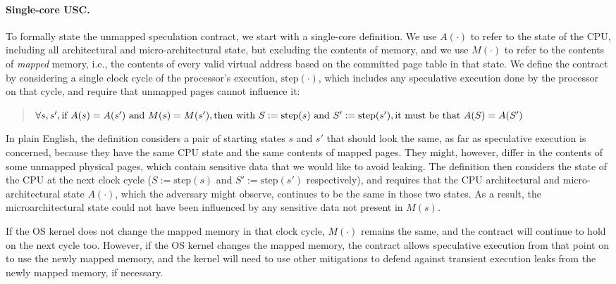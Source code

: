 \paragraph{Single-core USC.} To formally state the unmapped speculation contract, we start with a
single-core definition.  We use $A(\cdot)$ to refer to the state of
the CPU, including all architectural and micro-architectural state,
but excluding the contents of memory, and we use $M(\cdot)$ to refer
to the contents of \emph{mapped} memory, i.e., the contents of every
valid virtual address based on the committed page table in that state.
We define the contract by considering a single clock cycle of the
processor's execution, $\textrm{step}(\cdot)$, which includes any
speculative execution done by the processor on that cycle, and require
that unmapped pages cannot influence it:

\begin{small}
\begin{quote}
$\forall s, s', \\
  \textrm{if~} A(s) = A(s')
  \textrm{~and~} M(s) = M(s'), \\
  \textrm{then~with~} S := \textrm{step}(s)
  \textrm{~and~} S' := \textrm{step}(s'), \\
  \textrm{it~must~be~that~} A(S) = A(S')$
\end{quote}
\end{small}

In plain English, the definition considers a pair of starting states $s$
and $s'$ that should look the same, as far as speculative execution is
concerned, because they have the same CPU state and the same contents
of mapped pages.  They might, however, differ in the contents of some
unmapped physical pages, which contain sensitive data that we would
like to avoid leaking.  The definition then considers the state of
the CPU at the next clock cycle ($S := \textrm{step}(s)$ and $S' :=
\textrm{step}(s')$ respectively), and requires that the CPU architectural
and micro-architectural state $A(\cdot)$, which the adversary might
observe, continues to be the same in those two states.  As a result,
the microarchitectural state could not have been influenced by any
sensitive data not present in $M(s)$.

If the OS kernel does not change the mapped memory in that clock cycle,
$M(\cdot)$ remains the same, and the contract will continue to hold on
the next cycle too.  However, if the OS kernel changes the mapped memory,
the contract allows speculative execution from that point on to use the
newly mapped memory, and the kernel will need to use other mitigations
to defend against transient execution leaks from the newly mapped memory,
if necessary.

